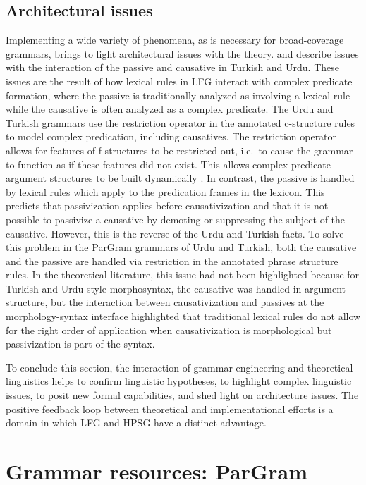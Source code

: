 \documentclass[output=paper,hidelinks]{langscibook}
\begin{document}
\subsection{Architectural issues}

Implementing a wide variety of phenomena, as is necessary for broad-coverage grammars,  brings to light architectural issues with the theory.  \cite{cetinogluetal08} and \cite{boegelbuttking2019} describe issues with the interaction of the passive and causative in Turkish and Urdu. These issues are the result of how lexical rules in LFG interact with complex predicate formation, where the passive is traditionally analyzed as involving a lexical rule while the causative is often analyzed as a complex predicate.  The Urdu and Turkish grammars use the restriction operator \citep{kaplanwedekind93} in the annotated c-structure rules to model complex predication, including causatives. The restriction operator allows for features of f-structures to be restricted out, i.e.\ to cause the grammar to function as if these features did not exist. This allows  complex predicate-argument structures to be built dynamically \citep{buttetal03,buttetal09}. In contrast, the passive is handled by lexical rules which apply to the predication frames in the lexicon. This predicts that passivization applies before causativization and that it is not possible to passivize a causative by demoting or suppressing the subject of the causative. However, this is the reverse of the Urdu and Turkish facts. To solve this problem in the ParGram grammars of Urdu and Turkish, both the causative and the passive are handled via restriction in the annotated phrase structure rules. In the theoretical literature, this issue had not been highlighted because for Turkish and Urdu style morphosyntax, the causative was handled in argument-structure, but the interaction between causativization and passives at the morphology-syntax interface highlighted that traditional lexical rules do not allow for the right order of application when causativization is morphological but passivization is part of the syntax.
    
To conclude this section, the interaction of grammar engineering and theoretical linguistics helps to confirm linguistic hypotheses, to highlight complex linguistic issues, to posit new formal capabilities, and shed light on  architecture issues.   The positive feedback loop between theoretical and implementational efforts is a domain in which LFG and HPSG have a distinct advantage.


\section{Grammar resources: ParGram}
\end{document}

